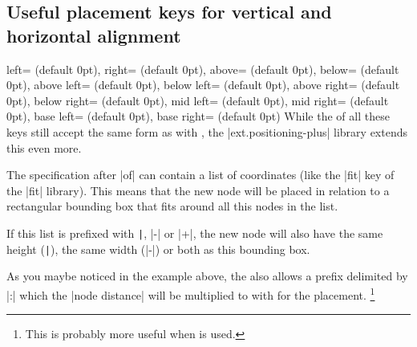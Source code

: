 \subsection{Useful placement keys for vertical and horizontal alignment}
\begin{multicols}{2}
\begin{keylist}[/\tikzext]{%
         left= (default 0pt),
        right= (default 0pt),
        above= (default 0pt),
        below= (default 0pt),
  above  left= (default 0pt),
  below  left= (default 0pt),
  above right= (default 0pt),
  below right= (default 0pt),
  mid    left= (default 0pt),
  mid   right= (default 0pt),
  base   left= (default 0pt),
  base  right= (default 0pt)%
}
  While the  of all these keys still accept the same form as with \tikzname,
  the |ext.positioning-plus| library extends this even more.
  
  The specification after |of| can contain a list of coordinates (like the |fit| key of the |fit| library).
  This means that the new node will be placed in relation to a rectangular bounding box
  that fits around all this nodes in the list.
  
  If this list is prefixed with \verb!|!, |-| or |+|,
  the new node will also have the same height (\verb!|!),
  the same width (|-|) or both as this bounding box.
  
\begin{codeexample}[preamble=\usetikzlibrary{ext.positioning-plus}, width=.3\linewidth]
\end{codeexample}
  
  As you maybe noticed in the example above, the  also allows a prefix
  delimited by |:| which the |node distance| will be multiplied to with for the placement.%
  \footnote{This is probably more useful when  is used.}
\end{keylist}


\end{multicols}

